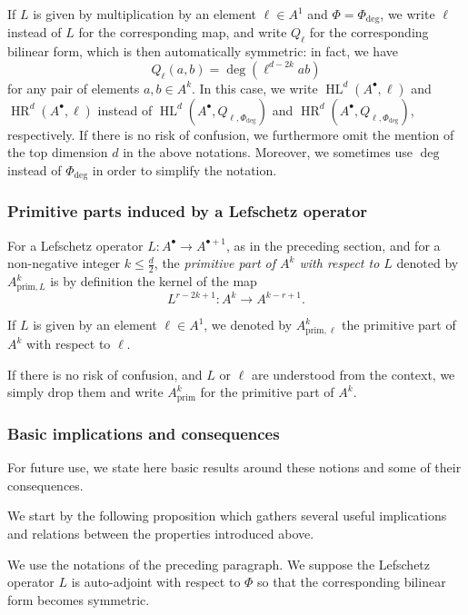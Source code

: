 \documentclass[11pt]{amsart}
\theoremstyle{definition}
\numberwithin{equation}{section}
\renewcommand{\~}{\widetilde}
\newcommand{\bul}{\bullet} %
\DeclareMathOperator{\HR}{HR} %
\DeclareMathOperator{\HL}{HL} %
\newcommand{\prim}{\mathrm{prim}} %
\begin{document}
\medskip

If $L$ is given by multiplication by an element $\ell\in A^1$ and $\Phi=\Phi_{\deg}$, we write $\ell$ instead of $L$ for the corresponding map, and write $Q_{\ell}$ for the corresponding bilinear form, which is then automatically symmetric: in fact, we have
\[Q_{\ell}(a,b)=\deg(\ell^{d-2k}ab)\]
for any pair of elements $a,b \in A^k$. In this case, we write $\HL^d(A^\bul, \ell)$ and $\HR^d(A^\bul, \ell)$ instead of $\HL^d(A^\bul, Q_{\ell,\Phi_{\deg}})$ and $\HR^d(A^\bul, Q_{\ell,\Phi_{\deg}})$, respectively. If there is no risk of confusion, we furthermore omit the mention of the top dimension $d$ in the above notations. Moreover, we sometimes use $\deg$ instead of $\Phi_{\deg}$ in order to simplify the notation.


\subsubsection{Primitive parts induced by a Lefschetz operator} For a Lefschetz operator $L\colon A^\bul \to A^{\bul+1}$, as in the preceding section, and for a non-negative integer $k\leq \frac d2$,
the \emph{primitive part of $A^k$ with respect to $L$} denoted by $A^k_{\prim, L}$ is by definition the kernel of the map
\[L^{r-2k+1} \colon A^{k} \longrightarrow A^{k-r+1}.\]

If $L$ is given by an element $\ell \in A^1$, we denoted by $A^k_{\prim, \ell}$ the primitive part of $A^k$ with respect to $\ell$.

If there is no risk of confusion, and $L$ or $\ell$ are understood from the context, we simply drop them and write $A^k_{\prim}$ for the primitive part of $A^k$.


\subsubsection{Basic implications and consequences} For future use, we state here basic results around these notions and some of their consequences.

We start by the following proposition which gathers several useful implications and relations between the properties introduced above.

We use the notations of the preceding paragraph. We suppose the Lefschetz operator $L$ is auto-adjoint with respect to $\Phi$ so that the corresponding bilinear form becomes symmetric.
\end{document}
